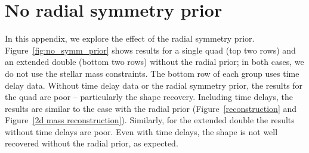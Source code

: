 \documentclass[galley,usenatbib]{mn2e}
\newcommand{\figref}[1] {Figure~\ref{#1}}
\begin{document}
\section{No radial symmetry prior}\label{no_symm_prior}

In this appendix, we explore the effect of the radial symmetry prior.
\figref{fig:no_symm_prior} shows results for a single quad (top two rows) and an
extended double (bottom two rows) without the radial prior; in both cases, we do not use the stellar mass
constraints. The bottom row of each group uses time delay data. Without time delay data or the radial symmetry prior, the results for the quad are poor -- particularly the shape recovery. Including time delays, the results are similar to the case with the radial prior (\figref{reconstruction} and \figref{2d mass reconstruction}). Similarly, for the extended double the results without time delays are poor. Even with time delays, the shape is not well recovered without the radial prior, as expected.
\end{document}
